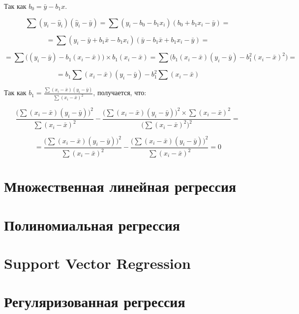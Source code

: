 \documentclass[
  letterpaper,
  DIV=11,
  numbers=noendperiod]{scrreprt}
\theoremstyle{definition}
\theoremstyle{remark}
\begin{document}
Так как \(b_0 = \bar y - b_1 x\).

\[
\sum (y_i - \hat y_i)(\hat y_i - \bar y) = \sum (y_i - b_0 - b_1 x_i) (b_0 + b_1 x_i - \bar y) =
\]

\[
= \sum (y_i - \bar y + b_1 \bar x - b_1x_i) (\bar y - b_1 \bar x + b_1 x_i - \bar y) =
\]

\[
= \sum \big( (y_i - \bar y) - b_1(x_i - \bar x) \big) \times b_1 (x_i - \bar x) = 
\sum \big( b_1 (x_i - \bar x) (y_i - \bar y) - b_1^2 (x_i - \bar x)^2 \big) = 
\]

\[
= b_1 \sum (x_i - \bar x) (y_i - \bar y) - b_1^2 \sum (x_i - \bar x)
\]

Так как
\(b_1 = \frac{\sum(x_i - \bar x)(y_i - \bar y)}{\sum (x_i - \bar x)^2}\),
получается, что:

\[
\frac{\Big( \sum (x_i - \bar x) (y_i - \bar y) \Big)^2}{\sum (x_i - \bar x)^2} - \frac{\Big( \sum (x_i - \bar x) (y_i - \bar y) \Big)^2 \times \sum (x_i - \bar x)^2}{\Big( \sum (x_i - \bar x)^2\Big)^2} = 
\]

\[
= \frac{\Big( \sum (x_i - \bar x) (y_i - \bar y) \Big)^2}{\sum (x_i - \bar x)^2} - \frac{\Big( \sum (x_i - \bar x) (y_i - \bar y) \Big)^2}{\sum (x_i - \bar x)^2} = 0
\]


\chapter{Множественная линейная регрессия}\label{andan-multiplelinear}


\chapter{Полиномиальная регрессия}\label{andan-polynomial}


\chapter{Support Vector Regression}\label{andan-svr}


\chapter{Регуляризованная регрессия}\label{andan-regreg}
\end{document}
